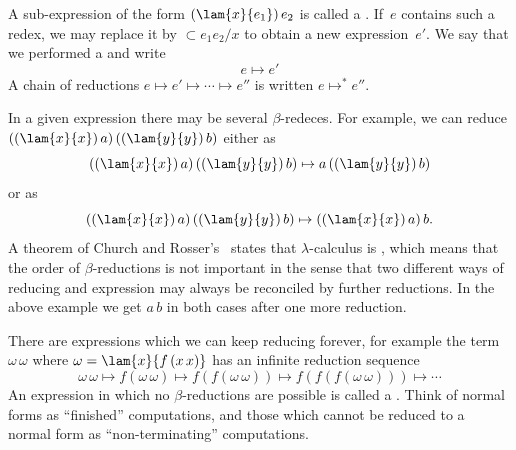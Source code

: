 A sub-expression of the form $(\lam{x}{e_1})\, e_2$ is called a .
If~$e$ contains such a redex, we may replace it by $\subset{e_1}{e_2/x}$ to obtain a new expression~$e'$. We say that we performed a  and write
%
\begin{equation*}
  e \mapsto e'
\end{equation*}
%
A chain of reductions $e \mapsto e' \mapsto \cdots \mapsto e''$ is written $e \mapsto^* e''$.

In a given expression there may be several $\beta$-redeces. For example, we can reduce
$((\lam{x}{x})\, a)\,((\lam{y}{y})\,b)$ either as
%
\begin{equation*}
  ((\lam{x}{x})\, a)\,((\lam{y}{y})\,b) \mapsto a\, ((\lam{y}{y})\,b)
\end{equation*}
%
or as
%
\begin{equation*}
  ((\lam{x}{x})\, a)\,((\lam{y}{y})\,b) \mapsto ((\lam{x}{x})\, a)\, b.
\end{equation*}
%
A theorem of Church and Rosser's~ states that
$\lambda$-calculus is , which means that the order of
$\beta$-reductions is not important in the sense that two different ways of
reducing and expression may always be reconciled by further reductions.
In the above example we get $a\,b$ in both cases after one more reduction.

There are expressions which we can keep reducing forever, for example
the term $\omega\,\omega$ where $\omega = \lam{x}{f\,(x\,x)}$ has an
infinite reduction sequence
%
\begin{equation*}
  \omega\, \omega \mapsto
  f(\omega\, \omega) \mapsto 
  f(f(\omega\, \omega)) \mapsto 
  f(f(f(\omega\, \omega))) \mapsto
  \cdots
\end{equation*}
%
An expression in which no $\beta$-reductions are possible is called a
. Think of normal forms as ``finished''
computations, and those which cannot be reduced to a normal form as
``non-terminating'' computations.

